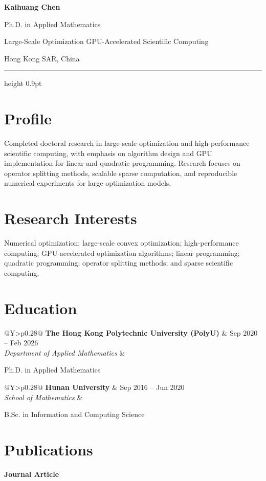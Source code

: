 \documentclass[11pt,a4paper]{article}
\makeatletter
\newcommand{\cvsubsection}[1]{%
    \vspace{0.15em}
    {\normalsize\bfseries\color{accent!90}#1}\par
    \vspace{0.2em}
}
\newcommand{\cventry}[4]{%
    \begin{tabularx}{\textwidth}{@{}Y>{\raggedleft\arraybackslash}p{0.28\textwidth}@{}}
        \textbf{#1} & \textcolor{textgray}{#2} \\
        \textit{#3} &
    \end{tabularx}
    #4\par\vspace{0.45em}
}
\makeatother
\begin{document}
\begin{center}
    {\fontsize{24}{28}\selectfont\bfseries Kaihuang Chen}\par
    \vspace{4pt}
    {\color{textgray}\normalsize Ph.D. in Applied Mathematics}\par
    {\color{textgray}\normalsize Large-Scale Optimization \textbar{} GPU-Accelerated Scientific Computing}\par
    \vspace{6pt}
    {\small Hong Kong SAR, China }
\end{center}

\vspace{0.35em}
{\color{softline}\hrule height 0.9pt}

\section*{Profile}
Completed doctoral research in large-scale optimization and high-performance scientific computing, with emphasis on algorithm design and GPU implementation for linear and quadratic programming. Research focuses on operator splitting methods, scalable sparse computation, and reproducible numerical experiments for large optimization models.

\section*{Research Interests}
Numerical optimization; large-scale convex optimization; high-performance computing; GPU-accelerated optimization algorithms; linear programming; quadratic programming; operator splitting methods; and sparse scientific computing.

\section*{Education}
\cventry{The Hong Kong Polytechnic University (PolyU)}{Sep 2020 -- Feb 2026}{Department of Applied Mathematics}{Ph.D. in Applied Mathematics}
\cventry{Hunan University}{Sep 2016 -- Jun 2020}{School of Mathematics}{B.Sc. in Information and Computing Science}

\section*{Publications}
\nocite{*}
\cvsubsection{Journal Article}
\printbibliography[heading=none,type=article,notkeyword=preprint]
\end{document}
